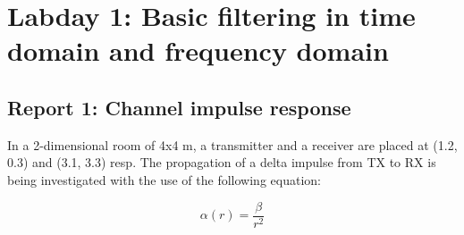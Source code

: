 \documentclass[final]{scrreprt} %
\begin{document}
\section*{Labday 1: Basic filtering in time domain and frequency domain}
\subsection*{Report 1: Channel impulse response}
In a 2-dimensional room of 4x4 m, a transmitter and a receiver are placed at (1.2, 0.3) and (3.1, 3.3) resp.
The propagation of a delta impulse from TX to RX is being investigated with the use of the following equation:

\begin{equation}
	\alpha (r) = \frac{\beta}{r^2}
\label{eq:damping}
\end{equation}
\end{document}
